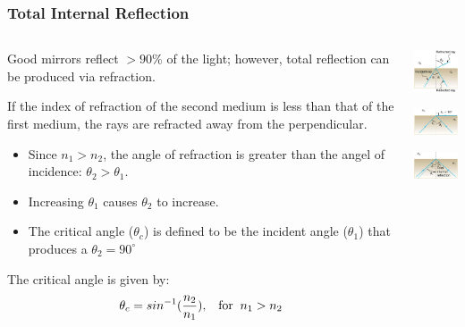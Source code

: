 \documentclass{beamer}
\begin{document}
\begin{frame}\frametitle{Total Internal Reflection}

\begin{columns}
\begin{column}{9.5cm}
Good mirrors reflect $>90$\% of the light; however, total reflection can be produced via refraction.\newline

If the index of refraction of the second medium is less than that of the first medium, the rays are refracted away from the perpendicular. 

\begin{itemize}
\item Since $n_1 > n_2$, the angle of refraction is greater than the angel of incidence: $\theta_2 > \theta_1$.
\item Increasing $\theta_1$ causes $\theta_2$ to increase.
\item The critical angle ($\theta_c$) is defined to be the incident angle ($\theta_1$) that produces a $\theta_2 = 90^\circ$ 
\end{itemize}

The critical angle is given by:
\begin{equation}
\theta_c = sin^{-1}(\frac{n_2}{n_1}), \hspace{3mm} \text{for} \hspace{2mm}  n_1 > n_2
\end{equation}

\end{column}
\begin{column}{3cm}
\begin{center}

\includegraphics[width=2.5cm]{fig/tir1.png}

\includegraphics[width=2.5cm]{fig/tir2.png}

\includegraphics[width=2.5cm]{fig/tir3.png}

\end{center}
\end{column}
\end{columns}
\end{frame}
\end{document}
